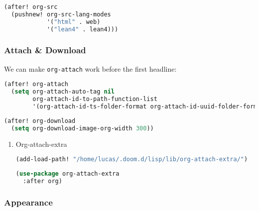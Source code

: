 \documentclass[11pt]{article}
\begin{document}
\begin{lstlisting}[language=Lisp]
(after! org-src
  (pushnew! org-src-lang-modes
            '("html" . web)
            '("lean4" . lean4)))
\end{lstlisting}

\subsubsection{Attach \& Download}
\label{sec:attach-download}
We can make \texttt{org-attach} work before the first headline:

\begin{lstlisting}[language=Lisp]
(after! org-attach
  (setq org-attach-auto-tag nil
        org-attach-id-to-path-function-list
        '(org-attach-id-ts-folder-format org-attach-id-uuid-folder-format identity)))
\end{lstlisting}

\begin{lstlisting}[language=Lisp]
(after! org-download
  (setq org-download-image-org-width 300))
\end{lstlisting}

\begin{enumerate}
  \item Org-attach-extra
  \label{sec:org-attach-extra}

  \begin{lstlisting}[language=Lisp]
(add-load-path! "/home/lucas/.doom.d/lisp/lib/org-attach-extra/")
\end{lstlisting}

\begin{lstlisting}[language=Lisp]
(use-package org-attach-extra
  :after org)
\end{lstlisting}
\end{enumerate}

\subsubsection{Appearance}
\label{sec:appearance}
\end{document}
